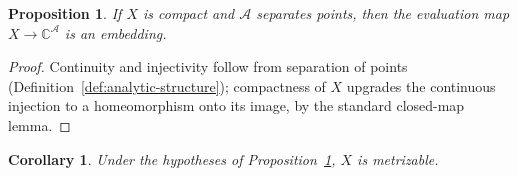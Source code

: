 \documentclass{amsbook}
\newtheorem{corollary}[theorem]{Corollary}
\newtheorem{proposition}[theorem]{Proposition}
\theoremstyle{definition}
\theoremstyle{remark}
\begin{document}
\begin{proposition}
\label{prop:compact-embed}
If $X$ is compact and $\mathcal{A}$ separates points, then the evaluation map
$X \to \mathbb{C}^{\mathcal{A}}$ is an embedding.
\end{proposition}

\begin{proof}
Continuity and injectivity follow from separation of points
(Definition~\ref{def:analytic-structure}); compactness of $X$ upgrades the
continuous injection to a homeomorphism onto its image, by the standard
closed-map lemma.
\end{proof}

\begin{corollary}
Under the hypotheses of Proposition~\ref{prop:compact-embed}, $X$ is
metrizable.
\end{corollary}

\backmatter



\end{document}
